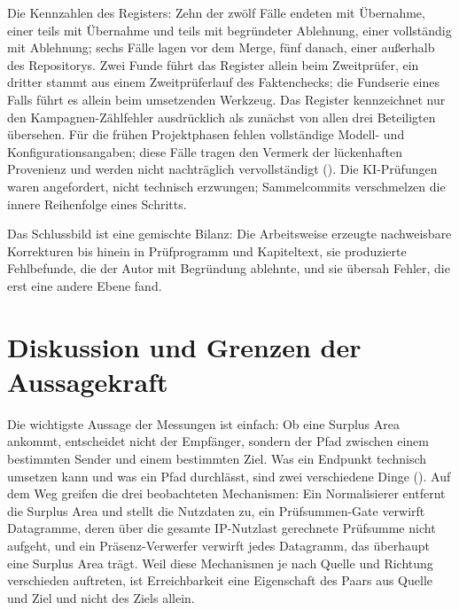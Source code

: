 Die Kennzahlen des Registers: Zehn der zwölf Fälle endeten mit Übernahme,
einer teils mit Übernahme und teils mit begründeter Ablehnung, einer vollständig mit Ablehnung; sechs
Fälle lagen vor dem Merge, fünf danach, einer außerhalb des Repositorys. Zwei Funde führt das Register
allein beim Zweitprüfer, ein dritter stammt aus einem Zweitprüferlauf des Faktenchecks; die Fundserie
eines Falls führt es allein beim umsetzenden Werkzeug. Das Register
kennzeichnet nur den Kampagnen-Zählfehler ausdrücklich als zunächst von allen drei Beteiligten
übersehen. Für die frühen Projektphasen fehlen vollständige Modell- und
Konfigurationsangaben; diese Fälle tragen den Vermerk der lückenhaften Provenienz und werden nicht
nachträglich vervollständigt (). Die KI-Prüfungen waren angefordert, nicht
technisch erzwungen; Sammelcommits verschmelzen die innere Reihenfolge eines Schritts.

Das Schlussbild ist eine gemischte Bilanz: Die Arbeitsweise erzeugte nachweisbare Korrekturen bis hinein
in Prüfprogramm und Kapiteltext, sie produzierte Fehlbefunde, die der Autor mit Begründung ablehnte, und
sie übersah Fehler, die erst eine andere Ebene fand.

\section{Diskussion und Grenzen der Aussagekraft}
\label{sec:diskussion-grenzen}

Die wichtigste Aussage der Messungen ist einfach: Ob eine Surplus Area ankommt, entscheidet nicht der Empfänger,
sondern der Pfad zwischen einem bestimmten Sender und einem bestimmten Ziel. Was ein Endpunkt technisch umsetzen
kann und was ein Pfad durchlässt, sind zwei verschiedene Dinge (). Auf dem Weg greifen die drei
beobachteten Mechanismen: Ein Normalisierer entfernt die Surplus Area und stellt die Nutzdaten zu, ein
Prüfsummen-Gate verwirft Datagramme, deren über die gesamte IP-Nutzlast gerechnete Prüfsumme nicht aufgeht, und ein
Präsenz-Verwerfer verwirft jedes Datagramm, das überhaupt eine Surplus Area trägt. Weil diese Mechanismen je nach
Quelle und Richtung verschieden auftreten, ist Erreichbarkeit eine Eigenschaft des Paars aus Quelle und Ziel und
nicht des Ziels allein.

